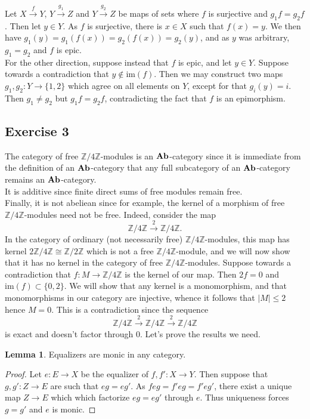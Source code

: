 \documentclass{article}
\theoremstyle{definition}
\newtheorem{lemma}[theorem]{Lemma}
\newcommand{\Z}{\mathbb{Z}}
\newcommand{\im}{\text{im}}
\newcommand{\catname}[1]{{\normalfont\textbf{#1}}}
\newcommand{\Ab}{\catname{Ab}}
\begin{document}
Let $X \xrightarrow{f} Y$, $Y \xrightarrow{g_1} Z$ and $Y \xrightarrow{g_2} Z$
be maps of sets where $f$ is surjective and $g_1f = g_2f$. Then let $y \in Y$.
As $f$ is surjective, there is $x \in X$ such that $f(x) = y$. We then have
$g_1(y) = g_1(f(x)) = g_2(f(x)) = g_2(y)$, and as $y$ was arbitrary, $g_1 =
g_2$ and $f$ is epic. \\

For the other direction, suppose instead that $f$ is epic, and let $y \in Y$.
Suppose towards a contradiction that $y \not \in \im(f)$. Then we may construct
two maps $g_1, g_2 : Y \to \{1, 2\}$ which agree on all elements on $Y$, except
for that $g_i(y) = i$. Then $g_1 \not = g_2$ but $g_1f = g_2f$, contradicting
the fact that $f$ is an epimorphism.

\subsection*{Exercise 3}

The category of free $\Z/4\Z$-modules is an $\Ab$-category since it is
immediate from the definition of an $\Ab$-category that any full subcategory of
an $\Ab$-category remains an $\Ab$-category. \\

It is additive since finite direct sums of free modules remain free. \\

Finally, it is not abeliean since for example, the kernel of a morphism of free
$\Z/4\Z$-modules need not be free. Indeed, consider the map 
\[
	\Z/4\Z \overset{2}\to \Z/4\Z.
\] 
In the category of ordinary (not necessarily free) $\Z/4\Z$-modules, this map
has kernel $2\Z/4\Z \cong \Z/2\Z$ which is not a free $\Z/4\Z$-module, and we
will now show that it has no kernel in the category of free $\Z/4\Z$-modules. 
Suppose towards a contradiction that $f : M \to \Z/4\Z$ is the kernel of our map.
Then $2f = 0$ and $\im(f) \subset \{0, 2\}$. We will show that any kernel 
is a monomorphism, and that monomorphisms in our category are injective,
whence it follows that $|M| \leq 2$ hence $M = 0$. This is a contradiction
since the sequence 
\[
	\Z/4\Z \overset{2}\to \Z/4\Z \overset{2}\to \Z/4\Z
\] 
is exact and doesn't factor through $0$. Let's prove the results we need.

\begin{lemma}
	Equalizers are monic in any category.
\end{lemma}
\begin{proof}
	Let $e : E \to X$ be the equalizer of $f, f' : X \to Y$. Then suppose that
	$g, g' : Z \to E$ are such that $eg = eg'$. As $feg = f'eg = f'eg'$, there
	exist a unique map $Z \to E$ which which factorize $eg = eg'$ through $e$.
	Thus uniqueness forces $g = g'$ and $e$ is monic.
\end{proof}
\end{document}
